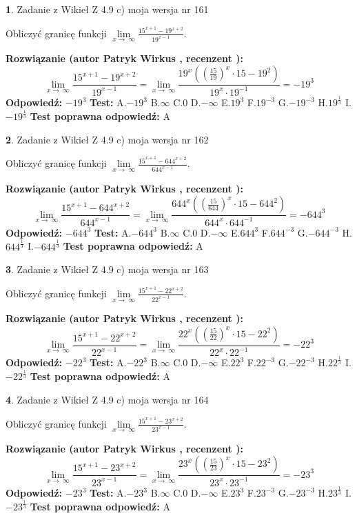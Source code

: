 \documentclass[12pt, a4paper]{article}
\theoremstyle{definition} %
\newtheorem{zad}{}
\newcommand{\zadStart}[1]{\begin{zad}#1\newline}
\newcommand{\zadStop}{\end{zad}}
\newcommand{\rozwStart}[2]{\noindent \textbf{Rozwiązanie (autor #1 , recenzent #2): }\newline}
\newcommand{\rozwStop}{\newline}
\newcommand{\odpStart}{\noindent \textbf{Odpowiedź:}\newline}
\newcommand{\odpStop}{\newline}
\newcommand{\testStart}{\noindent \textbf{Test:}\newline}
\newcommand{\testStop}{\newline}
\newcommand{\kluczStart}{\noindent \textbf{Test poprawna odpowiedź:}\newline}
\newcommand{\kluczStop}{\newline}
\begin{document}
\zadStart{Zadanie z Wikieł Z 4.9 c) moja wersja nr 161}


Obliczyć granicę funkcji  $\lim\limits_{x\to\ \infty}\frac{15^{x+1}-19^{x+2}}{19^{x-1}}$.
\zadStop
\rozwStart{Patryk Wirkus}{}
$$\lim\limits_{x\to\ \infty}\frac{15^{x+1}-19^{x+2}}{19^{x-1}}=\lim\limits_{x\to\ \infty}\frac{19^{x}((\frac{15}{19})^{x}\cdot 15 -19^{2})}{19^{x}\cdot 19^{-1}} = -19^{3}$$
\rozwStop
\odpStart
$-19^{3}$
\odpStop
\testStart
A.$-19^{3}$ B.$\infty$ C.$0$ D.$-\infty$ E.$19^{3}$
F.$19^{-3}$ G.$-19^{-3}$
H.$19^{\frac{1}{3}}$
I.$-19^{\frac{1}{3}}$
\testStop
\kluczStart
A
\kluczStop



\zadStart{Zadanie z Wikieł Z 4.9 c) moja wersja nr 162}


Obliczyć granicę funkcji  $\lim\limits_{x\to\ \infty}\frac{15^{x+1}-644^{x+2}}{644^{x-1}}$.
\zadStop
\rozwStart{Patryk Wirkus}{}
$$\lim\limits_{x\to\ \infty}\frac{15^{x+1}-644^{x+2}}{644^{x-1}}=\lim\limits_{x\to\ \infty}\frac{644^{x}((\frac{15}{644})^{x}\cdot 15 -644^{2})}{644^{x}\cdot 644^{-1}} = -644^{3}$$
\rozwStop
\odpStart
$-644^{3}$
\odpStop
\testStart
A.$-644^{3}$ B.$\infty$ C.$0$ D.$-\infty$ E.$644^{3}$
F.$644^{-3}$ G.$-644^{-3}$
H.$644^{\frac{1}{3}}$
I.$-644^{\frac{1}{3}}$
\testStop
\kluczStart
A
\kluczStop



\zadStart{Zadanie z Wikieł Z 4.9 c) moja wersja nr 163}


Obliczyć granicę funkcji  $\lim\limits_{x\to\ \infty}\frac{15^{x+1}-22^{x+2}}{22^{x-1}}$.
\zadStop
\rozwStart{Patryk Wirkus}{}
$$\lim\limits_{x\to\ \infty}\frac{15^{x+1}-22^{x+2}}{22^{x-1}}=\lim\limits_{x\to\ \infty}\frac{22^{x}((\frac{15}{22})^{x}\cdot 15 -22^{2})}{22^{x}\cdot 22^{-1}} = -22^{3}$$
\rozwStop
\odpStart
$-22^{3}$
\odpStop
\testStart
A.$-22^{3}$ B.$\infty$ C.$0$ D.$-\infty$ E.$22^{3}$
F.$22^{-3}$ G.$-22^{-3}$
H.$22^{\frac{1}{3}}$
I.$-22^{\frac{1}{3}}$
\testStop
\kluczStart
A
\kluczStop



\zadStart{Zadanie z Wikieł Z 4.9 c) moja wersja nr 164}


Obliczyć granicę funkcji  $\lim\limits_{x\to\ \infty}\frac{15^{x+1}-23^{x+2}}{23^{x-1}}$.
\zadStop
\rozwStart{Patryk Wirkus}{}
$$\lim\limits_{x\to\ \infty}\frac{15^{x+1}-23^{x+2}}{23^{x-1}}=\lim\limits_{x\to\ \infty}\frac{23^{x}((\frac{15}{23})^{x}\cdot 15 -23^{2})}{23^{x}\cdot 23^{-1}} = -23^{3}$$
\rozwStop
\odpStart
$-23^{3}$
\odpStop
\testStart
A.$-23^{3}$ B.$\infty$ C.$0$ D.$-\infty$ E.$23^{3}$
F.$23^{-3}$ G.$-23^{-3}$
H.$23^{\frac{1}{3}}$
I.$-23^{\frac{1}{3}}$
\testStop
\kluczStart
A
\kluczStop
\end{document}

